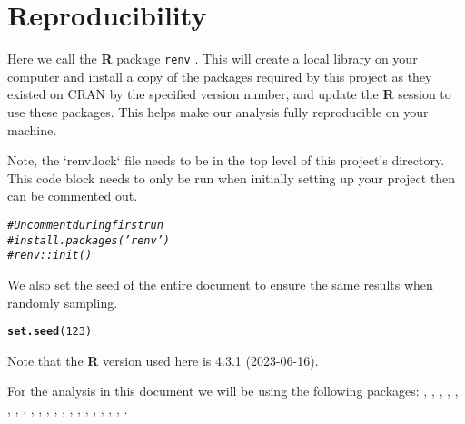 \documentclass{article}\usepackage[]{graphicx}\usepackage[]{xcolor}
\makeatletter
\newcommand{\hlnum}[1]{\textcolor[rgb]{0.686,0.059,0.569}{#1}}%
\newcommand{\hlcom}[1]{\textcolor[rgb]{0.678,0.584,0.686}{\textit{#1}}}%
\newcommand{\hlstd}[1]{\textcolor[rgb]{0.345,0.345,0.345}{#1}}%
\newcommand{\hlkwd}[1]{\textcolor[rgb]{0.737,0.353,0.396}{\textbf{#1}}}%
\newenvironment{kframe}{%
 \def\at@end@of@kframe{}%
 \ifinner\ifhmode%
  \def\at@end@of@kframe{\end{minipage}}%
  \begin{minipage}{\columnwidth}%
 \fi\fi%
 \def\FrameCommand##1{\hskip\@totalleftmargin \hskip-\fboxsep
 \colorbox{shadecolor}{##1}\hskip-\fboxsep
     \hskip-\linewidth \hskip-\@totalleftmargin \hskip\columnwidth}%
 \MakeFramed {\advance\hsize-\width
   \@totalleftmargin\z@ \linewidth\hsize
   \@setminipage}}%
 {\par\unskip\endMakeFramed%
 \at@end@of@kframe}
\newenvironment{knitrout}{}{} %
\makeatother
\begin{document}
\section{Reproducibility}
\label{reproducibility}

Here we call the  \textbf{R} package \texttt{renv} \cite{R-renv}. This will create a local library on your computer and install a copy of the packages required by this project as they existed on CRAN by the specified version number, and update the \textbf{R} session to use these packages. This helps make our analysis fully reproducible on your machine. 

Note, the `renv.lock` file needs to be in the top level of this project's directory. This code block needs to only be run when initially setting up your project then can be commented out.

\begin{knitrout}
\color{fgcolor}\begin{kframe}
\begin{alltt}
\hlcom{# Uncomment during first run}
\hlcom{# install.packages('renv')}
\hlcom{# renv::init()}
\end{alltt}
\end{kframe}
\end{knitrout}

We also set the seed of the entire document to ensure the same results when randomly sampling.

\begin{knitrout}
\color{fgcolor}\begin{kframe}
\begin{alltt}
\hlkwd{set.seed}\hlstd{(}\hlnum{123}\hlstd{)}
\end{alltt}
\end{kframe}
\end{knitrout}


Note that the \textbf{R} version used here is 4.3.1 (2023-06-16).






 
For the analysis in this document we will be using the following packages:  \cite{R-data.table},  \cite{R-foreach},  \cite{R-formatR},  \cite{R-ggthemes},  \cite{R-gmodels},  \cite{R-hablar},  \cite{R-leaflet},  \cite{R-lintr},  \cite{R-magrittr},  \cite{R-knitr},  \cite{R-kknn},  \cite{R-plyr},  \cite{R-raster},  \cite{R-renv},  \cite{R-reshape2},  \cite{R-rgdal},  \cite{R-rworldmap},  \cite{R-sf},  \cite{R-tidyverse},  \cite{R-viridis},  \cite{R-zoo}.
\end{document}
